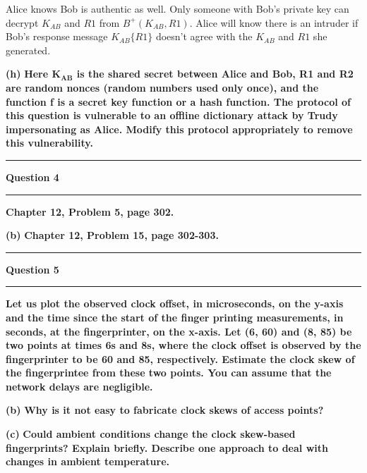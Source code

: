 \documentclass[11pt]{article}
\newcommand\question[2]{\vspace{.25in}\hrule\textbf{#1}\vspace{.5em}\hrule\vspace{.10in}}
\renewcommand\part[1]{\vspace{.10in}\textbf{(#1)}}
\begin{document}
Alice knows Bob is authentic as well. Only someone with Bob's private key can decrypt $K_{AB}$ and $R1$ from $B^+(K_{AB}, R1)$. Alice will know there is an intruder if Bob's response message $K_{AB}\{R1\}$ doesn't agree with the $K_{AB}$ and $R1$ she generated.

\part{h} \textbf{Here $\mathbf{K_{AB}}$ is the shared secret between Alice and Bob, R1 and R2 are random nonces (random numbers used only once), and the function f is a secret key function or a hash function. The protocol of this question is vulnerable to an offline dictionary attack by Trudy impersonating as Alice. Modify this protocol appropriately to remove this vulnerability.}

\question{Question 4}

\part{a} \textbf{Chapter 12, Problem 5, page 302.}

\part{b} \textbf{Chapter 12, Problem 15, page 302-303.}

\question{Question 5}

\part{a} \textbf{Let us plot the observed clock offset, in microseconds, on the y-axis and the time since the start of the finger printing measurements, in seconds, at the fingerprinter, on the x-axis. Let (6, 60) and (8, 85) be two points at times 6s and 8s, where the clock offset is observed by the fingerprinter to be 60 and 85, respectively. Estimate the clock skew of the fingerprintee from these two points. You can assume that the network delays are negligible.} 

\part{b} \textbf{Why is it not easy to fabricate clock skews of access points?}

\part{c} \textbf{Could ambient conditions change the clock skew-based fingerprints? Explain briefly. Describe one approach to deal with changes in ambient temperature.}
\end{document}
